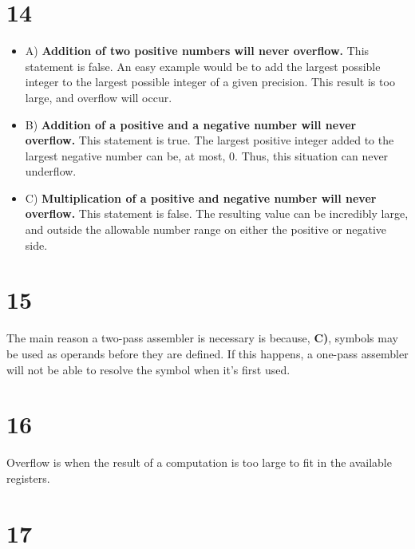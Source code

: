 \documentclass[a4paper,11pt]{article}
\begin{document}

\section*{14}
\begin{itemize}
  \item A) {\bf Addition of two positive numbers will never overflow.}  This statement is false.  An easy example would be to add the largest possible integer to the largest possible integer of a given precision.  This result is too large, and overflow will occur.
  \item B) {\bf Addition of a positive and a negative number will never overflow.}  This statement is true.  The largest positive integer added to the largest negative number can be, at most, 0.  Thus, this situation can never underflow.
  \item C) {\bf Multiplication of a positive and negative number will never overflow.}  This statement is false.  The resulting value can be incredibly large, and outside the allowable number range on either the positive or negative side.
\end{itemize}


\section*{15}
The main reason a two-pass assembler is necessary is because, {\bf C)}, symbols may be used as operands before they are defined.  If this happens, a one-pass assembler will not be able to resolve the symbol when it's first used. 
 

\section*{16}
Overflow is when the result of a computation is too large to fit in the available registers. 


\section*{17}
\end{document}
